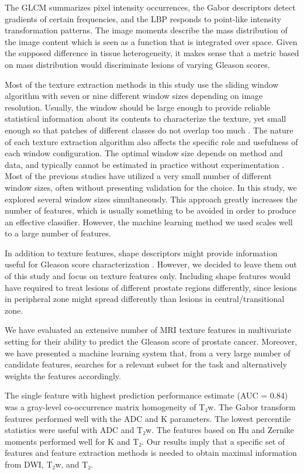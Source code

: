 The GLCM summarizes pixel intensity occurrences, the Gabor descriptors detect
gradients of certain frequencies, and the LBP responds to point-like intensity
transformation patterns. The image moments describe the mass distribution of the
image content which is seen as a function that is integrated over space. Given
the supposed difference in tissue heterogeneity, it makes sense that a metric
based on mass distribution would discriminate lesions of varying Gleason scores.

Most of the texture extraction methods in this study use the sliding window
algorithm with seven or nine different window sizes depending on image
resolution. Usually, the window should be large enough to provide reliable
statistical information about its contents to characterize the texture, yet
small enough so that patches of different classes do not overlap too much
\citep{Haralick1973, Clausi2002Analysis}. The nature of each texture extraction
algorithm also affects the specific role and usefulness of each window
configuration. The optimal window size depends on method and data, and typically
cannot be estimated in practice without experimentation \citep{Puig2001}. Most
of the previous studies have utilized a very small number of different window
sizes, often without presenting validation for the choice. In this study, we
explored several window sizes simultaneously. This approach greatly increases
the number of features, which is usually something to be avoided in order to
produce an effective classifier. However, the machine learning method we used
scales well to a large number of features.

In addition to texture features, shape descriptors might provide information
useful for Gleason score characterization \citep{Hoeks2011}. However, we
decided to leave them out of this study and focus on texture features only.
Including shape features would have required to treat lesions of different
prostate regions differently, since lesions in peripheral zone might spread
differently than lesions in central/transitional zone.

We have evaluated an extensive number of MRI texture features in multivariate
setting for their ability to predict the Gleason score of prostate cancer.
Moreover, we have presented a machine learning system that, from a very large
number of candidate features, searches for a relevant subset for the task and
alternatively weights the features accordingly.

The single feature with highest
prediction performance estimate (AUC = 0.84) was a gray-level co-occurrence
matrix homogeneity of T₂w. The Gabor transform features performed well with the
ADC and K parameters. The lowest percentile statistics were useful with ADC and
T₂w. The features based on Hu and Zernike moments performed well for K and T₂.
Our results imply that a specific set of features and feature extraction methods
is needed to obtain maximal information from DWI, T₂w, and T₂.

